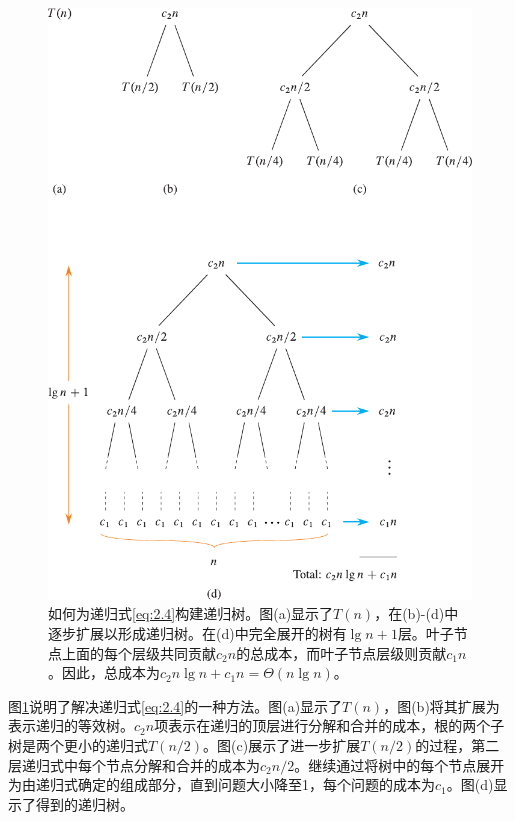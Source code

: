 \documentclass[lang=cn,newtx,10pt,scheme=chinese]{elegantbook}
\begin{document}
\begin{figure}[htbp]
    \centering
    \includegraphics{算法导论第四版插图/第二章/归并排序的递归树示意图.pdf}
    \caption{如何为递归式\eqref{eq:2.4}构建递归树。图(a)显示了$T(n)$，在(b)-(d)中逐步扩展以形成递归树。在(d)中完全展开的树有$\lg n + 1$层。叶子节点上面的每个层级共同贡献$c_2n$的总成本，而叶子节点层级则贡献$c_1n$。因此，总成本为$c_2 n \lg n+c_1 n=\Theta(n \lg n)$。}
    \label{fig:归并排序的递归树示意图}
\end{figure}

图\ref{fig:归并排序的递归树示意图}说明了解决递归式\eqref{eq:2.4}的一种方法。图(a)显示了$T(n)$，图(b)将其扩展为表示递归的等效树。$c_2n$项表示在递归的顶层进行分解和合并的成本，根的两个子树是两个更小的递归式$T(n/2)$。图(c)展示了进一步扩展$T(n/2)$的过程，第二层递归式中每个节点分解和合并的成本为$c_2 n/2$。继续通过将树中的每个节点展开为由递归式确定的组成部分，直到问题大小降至1，每个问题的成本为$c_1$。图(d)显示了得到的递归树。
\end{document}
